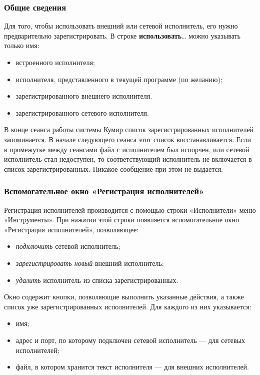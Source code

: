 \subsubsection{Общие сведения}

Для того, чтобы использовать внешний или сетевой исполнитель, его нужно предварительно зарегистрировать. В строке \textsf{\textbf{использовать}\dots} можно указывать только имя:
\begin{itemize}
\item встроенного исполнителя;
\item исполнителя, представленного в текущей программе (по желанию);
\item зарегистрированного внешнего исполнителя.
\item зарегистрированного сетевого исполнителя.
\end{itemize}

В конце сеанса работы системы Кумир список зарегистрированных исполнителей запоминается. В начале следующего сеанса этот список восстанавливается. Если в промежутке между сеансами файл с исполнителем был испорчен, или сетевой исполнитель стал недоступен, то соответствующий исполнитель не включается в список зарегистрированных. Никакое сообщение при этом не выдается.

\subsubsection{Вспомогательное окно «Регистрация исполнителей»}
Регистрация исполнителей производится с помощью строки «Исполнители» меню «Инструменты». При нажатии этой строки появляется вспомогательное окно «Регистрация исполнителей», позволяющее:
\begin{itemize}
\item \emph{подключить} сетевой исполнитель;
\item \emph{зарегистрировать новый} внешний исполнитель;
\item \emph{удалить} исполнитель из списка зарегистрированных.
\end{itemize}
Окно содержит кнопки, позволяющие выполнить указанные действия, а также список уже зарегистрированных исполнителей. Для каждого из них указывается:
\begin{itemize}
\item имя;
\item адрес и порт, по которому подключен сетевой исполнитель --- для сетевых исполнителей;
\item файл, в котором хранится текст исполнителя --- для внешних исполнителей.
\end{itemize}

